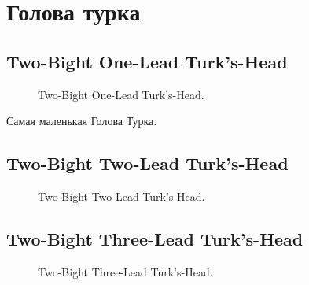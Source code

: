 \section{Голова турка} \label{chapter_Turk-Head}

\subsection{Two-Bight One-Lead Turk’s-Head}

\begin{figure}[H]\centering
	\begin{minipage}{1\linewidth}
		\begin{center}
			\tcbox[enhanced jigsaw,colframe=black,opacityframe=0.5,opacityback=0.5]
			{\centering{}}
		\end{center}
	\end{minipage}
\caption{Two-Bight One-Lead Turk’s-Head.}
\label{ris:Turk-Head_1}
\end{figure}

Самая маленькая Голова Турка.

\subsection{Two-Bight Two-Lead Turk’s-Head}

\begin{figure}[H]\centering
	\begin{minipage}{1\linewidth}
		\begin{center}
			\tcbox[enhanced jigsaw,colframe=black,opacityframe=0.5,opacityback=0.5]
			{\centering{}}
		\end{center}
	\end{minipage}
\caption{Two-Bight Two-Lead Turk’s-Head.}
\label{ris:Turk-Head_2}
\end{figure}

\subsection{Two-Bight Three-Lead Turk’s-Head}

\begin{figure}[H]\centering
	\begin{minipage}{1\linewidth}
		\begin{center}
			\tcbox[enhanced jigsaw,colframe=black,opacityframe=0.5,opacityback=0.5]
			{\centering{}}
		\end{center}
	\end{minipage}
\caption{Two-Bight Three-Lead Turk’s-Head.}
\label{ris:Turk-Head_3}
\end{figure}

